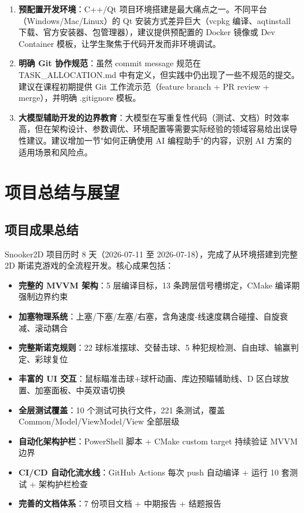\documentclass[11pt]{ctexart}
\begin{document}
\begin{enumerate}[leftmargin=*]

\item \textbf{预配置开发环境}：C++/Qt 项目环境搭建是最大痛点之一。不同平台（Windows/Mac/Linux）的 Qt 安装方式差异巨大（vcpkg 编译、aqtinstall 下载、官方安装器、包管理器），建议提供预配置的 Docker 镜像或 Dev Container 模板，让学生聚焦于代码开发而非环境调试。

\item \textbf{明确 Git 协作规范}：虽然 commit message 规范在 TASK\_ALLOCATION.md 中有定义，但实践中仍出现了一些不规范的提交。建议在课程初期提供 Git 工作流示范（feature branch + PR review + merge），并明确 .gitignore 模板。

\item \textbf{大模型辅助开发的边界教育}：大模型在写重复性代码（测试、文档）时效率高，但在架构设计、参数调优、环境配置等需要实际经验的领域容易给出误导性建议。建议增加一节"如何正确使用 AI 编程助手"的内容，识别 AI 方案的适用场景和风险点。

\end{enumerate}

\section{项目总结与展望}

\subsection{项目成果总结}

Snooker2D 项目历时 8 天（2026-07-11 至 2026-07-18），完成了从环境搭建到完整 2D 斯诺克游戏的全流程开发。核心成果包括：

\begin{itemize}
\item \textbf{完整的 MVVM 架构}：5 层编译目标，13 条跨层信号槽绑定，CMake 编译期强制边界约束
\item \textbf{加塞物理系统}：上塞/下塞/左塞/右塞，含角速度-线速度耦合碰撞、自旋衰减、滚动耦合
\item \textbf{完整斯诺克规则}：22 球标准摆球、交替击球、5 种犯规检测、自由球、输赢判定、彩球复位
\item \textbf{丰富的 UI 交互}：鼠标瞄准击球+球杆动画、库边预瞄辅助线、D 区白球放置、加塞面板、中英双语切换
\item \textbf{全层测试覆盖}：10 个测试可执行文件，221 条测试，覆盖 Common/Model/ViewModel/View 全部层级
\item \textbf{自动化架构护栏}：PowerShell 脚本 + CMake custom target 持续验证 MVVM 边界
\item \textbf{CI/CD 自动化流水线}：GitHub Actions 每次 push 自动编译 + 运行 10 套测试 + 架构护栏检查
\item \textbf{完善的文档体系}：7 份项目文档 + 中期报告 + 结题报告
\end{itemize}
\end{document}
